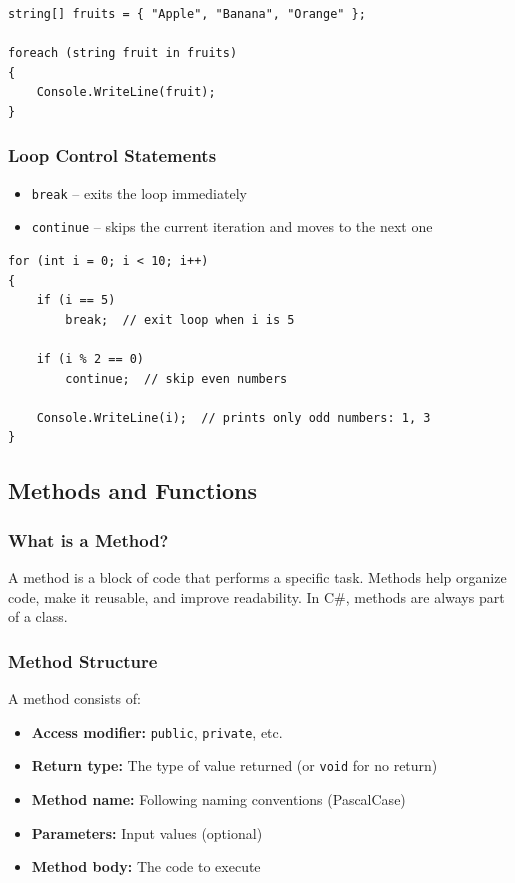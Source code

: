 \documentclass{article}
\begin{document}
\begin{verbatim}
string[] fruits = { "Apple", "Banana", "Orange" };

foreach (string fruit in fruits)
{
    Console.WriteLine(fruit);
}
\end{verbatim}

\subsubsection{Loop Control Statements}
\begin{itemize}
    \item \texttt{break} -- exits the loop immediately
    \item \texttt{continue} -- skips the current iteration and moves to the next one
\end{itemize}

\begin{verbatim}
for (int i = 0; i < 10; i++)
{
    if (i == 5)
        break;  // exit loop when i is 5
    
    if (i % 2 == 0)
        continue;  // skip even numbers
    
    Console.WriteLine(i);  // prints only odd numbers: 1, 3
}
\end{verbatim}

\subsection{Methods and Functions}

\subsubsection{What is a Method?}
A method is a block of code that performs a specific task. Methods help organize code, make it reusable, and improve readability. In C\#, methods are always part of a class.

\subsubsection{Method Structure}
A method consists of:
\begin{itemize}
    \item \textbf{Access modifier:} \texttt{public}, \texttt{private}, etc.
    \item \textbf{Return type:} The type of value returned (or \texttt{void} for no return)
    \item \textbf{Method name:} Following naming conventions (PascalCase)
    \item \textbf{Parameters:} Input values (optional)
    \item \textbf{Method body:} The code to execute
\end{itemize}
\end{document}
